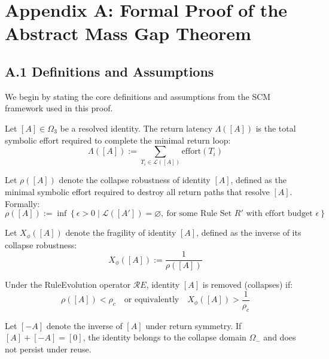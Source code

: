 
\appendix
\section*{Appendix A: Formal Proof of the Abstract Mass Gap Theorem}

\subsection*{A.1 Definitions and Assumptions}

We begin by stating the core definitions and assumptions from the SCM framework used in this proof.

\begin{definition}
Let $[A] \in \Omega_3$ be a resolved identity. The return latency $\Lambda([A])$ is the total symbolic effort required to complete the minimal return loop:
\[
\Lambda([A]) := \sum_{T_i \in \mathcal{L}([A])} \text{effort}(T_i)
\]
\end{definition}

\begin{definition}
Let $\rho([A])$ denote the collapse robustness of identity $[A]$, defined as the minimal symbolic effort required to destroy all return paths that resolve $[A]$. Formally:
\[
\rho([A]) := \inf \left\{ \epsilon > 0 \mid \mathcal{L}([A']) = \varnothing,\ \text{for some Rule Set } R' \text{ with effort budget } \epsilon \right\}
\]
\end{definition}

\begin{definition}[Fragility]
Let $X_\phi([A])$ denote the fragility of identity $[A]$, defined as the inverse of its collapse robustness:
\[
X_\phi([A]) := \frac{1}{\rho([A])}
\]
\end{definition}

\begin{definition}
Under the RuleEvolution operator $\mathcal{R}E$, identity $[A]$ is removed (collapses) if:
\[
\rho([A]) < \rho_c
\quad \text{or equivalently} \quad
X_\phi([A]) > \frac{1}{\rho_c}
\]
\end{definition}

\begin{definition}
Let $[-A]$ denote the inverse of $[A]$ under return symmetry. If $[A] + [-A] = [0]$, the identity belongs to the collapse domain $\Omega_-$ and does not persist under reuse.
\end{definition}

